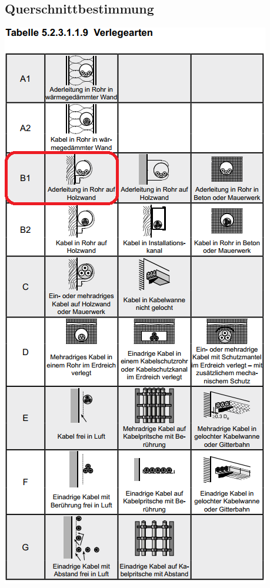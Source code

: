 \begin{landscape}
\chapter{Querschnittbestimmung}\label{app:nin}
\begin{minipage}{0.35\textwidth}
	\centering
		\includegraphics[height=.80\textheight]{images/NIN_Art.png}

\end{minipage}
\end{landscape}
